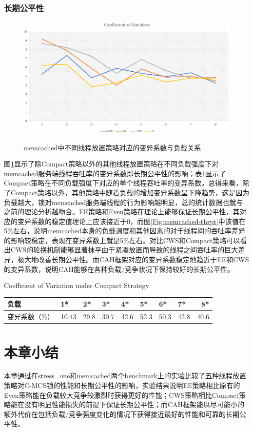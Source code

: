 \subsubsection{长期公平性}
\begin{figure}[t]
	\centering
	\includegraphics[width=5.6in]{figure/memcached-cv.PNG}
	\caption{memcached中不同线程放置策略对应的变异系数与负载关系}{}
	\label{Fig:memcached-fairness}
\end{figure}


图\ref{Fig:memcached-fairness}显示了除Compact策略以外的其他线程放置策略在不同负载强度下对memcached服务端线程吞吐率的变异系数即长期公平性的影响；表\ref{tab:CV-Compact}显示了Compact策略在不同负载强度下对应的单个线程吞吐率的变异系数。总得来看，除了Compact策略以外，其他策略中随着负载的增加变异系数呈下降趋势，这是因为负载越大，锁对memcached服务端线程的行为影响越明显，总的统计数据也就与之前的理论分析越吻合。EE策略和Even策略在理论上能够保证长期公平性，其对应的变异系数的稳定值理论上应该接近于0，而图\ref{Fig:memcached-thrpt}中该值在5\%左右，说明memcached本身的负载调度和其他因素的对于线程间的吞吐率差异的影响较稳定，表现在变异系数上就是5\%左右。对比CWS和Compact策略可以看出CWS的轮换机制能够显著抹平由于紧凑放置而导致的线程之间吞吐率的巨大差异，极大地改善长期公平性。而CAH框架对应的变异系数稳定地趋近于EE和CWS的变异系数，说明CAH能够在各种负载/竞争状况下保持较好的长期公平性。
\begin{table}[H]
  \centering
    {Coefficient of Variation under Compact Strategy}
  \label{tab:CV-Compact}
  \begin{tabular}{@{}llllllllr@{}} \toprule
    负载 & 1* & 2* & 3* & 4* & 5* & 6* & 7* & 8*\\ \midrule
    变异系数（\%）	&10.43	&29.8	& 30.7	& 42.6	& 52.3 &50.3 &42.8 &40.6 \\
  \end{tabular}
\end{table}
\section{本章小结}
本章通过在stress\_one和memcached两个benchmark上的实验比较了五种线程放置策略对C-MCS锁的性能和长期公平性的影响，实验结果说明EE策略相比原有的Even策略能在负载较大竞争较激烈时获得更好的性能；CWS策略相比Compact策略能在没有明显性能损失的前提下保证长期公平性；而CAH框架能以尽可能小的额外代价在包括负载/竞争强度变化的情况下获得接近最好的性能和可靠的长期公平性。